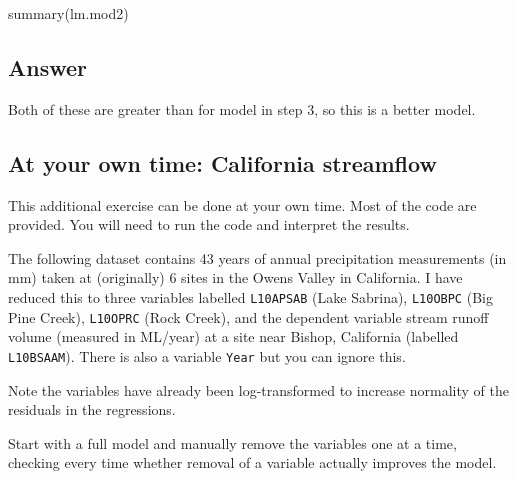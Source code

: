 \documentclass[
  10pt,
  letterpaper,
  DIV=11,
  numbers=noendperiod]{scrartcl}
\newenvironment{Shaded}{\begin{snugshade}}{\end{snugshade}}
\newcommand{\FunctionTok}[1]{\textcolor[rgb]{0.28,0.35,0.67}{#1}}
\newcommand{\NormalTok}[1]{\textcolor[rgb]{0.00,0.23,0.31}{#1}}
\begin{document}
\begin{Shaded}
\begin{Highlighting}[]
\FunctionTok{summary}\NormalTok{(lm.mod2)}
\end{Highlighting}
\end{Shaded}

\hypertarget{answer-12}{%
\subsection{Answer}\label{answer-12}}

Both of these are greater than for model in step 3, so this is a better
model.

\hypertarget{at-your-own-time-california-streamflow}{%
\subsection{At your own time: California
streamflow}\label{at-your-own-time-california-streamflow}}

\begin{tcolorbox}[enhanced jigsaw, rightrule=.15mm, coltitle=black, leftrule=.75mm, titlerule=0mm, breakable, toprule=.15mm, bottomtitle=1mm, colback=white, toptitle=1mm, opacitybacktitle=0.6, bottomrule=.15mm, arc=.35mm, left=2mm, title=\textcolor{quarto-callout-note-color}{\faInfo}\hspace{0.5em}{Note}, colbacktitle=quarto-callout-note-color!10!white, opacityback=0, colframe=quarto-callout-note-color-frame]

This additional exercise can be done at your own time. Most of the code
are provided. You will need to run the code and interpret the results.

\end{tcolorbox}

The following dataset contains 43 years of annual precipitation
measurements (in mm) taken at (originally) 6 sites in the Owens Valley
in California. I have reduced this to three variables labelled
\texttt{L10APSAB} (Lake Sabrina), \texttt{L10OBPC} (Big Pine Creek),
\texttt{L10OPRC} (Rock Creek), and the dependent variable stream runoff
volume (measured in ML/year) at a site near Bishop, California (labelled
\texttt{L10BSAAM}). There is also a variable \texttt{Year} but you can
ignore this.

Note the variables have already been log-transformed to increase
normality of the residuals in the regressions.

Start with a full model and manually remove the variables one at a time,
checking every time whether removal of a variable actually improves the
model.
\end{document}

